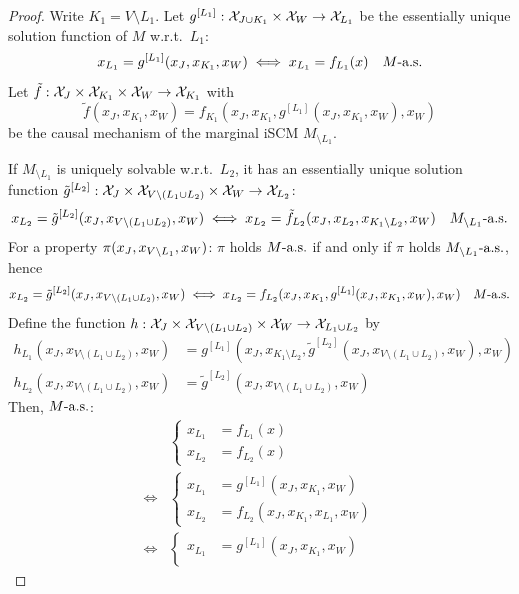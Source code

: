 \begin{proof}
  Write $K_1 = V \setminus L_1$.
  Let $g^{[L_1]} : \mathcal{X}_{J\cup K_1} \times \mathcal{X}_{W} \to \mathcal{X}_{L_1}$ be the essentially unique solution function of $M$ w.r.t.\ $L_1$:
  $$x_{L_1} = g^{[L_1]}(x_J,x_{K_1},x_W) \iff x_{L_1} = f_{L_1}(x) \quad M\text{-a.s.}$$
  Let $\tilde{f} : \mathcal{X}_J \times \mathcal{X}_{K_1} \times \mathcal{X}_{W} \to \mathcal{X}_{K_1}$ with
  $$\tilde{f}(x_J,x_{K_1},x_W) = f_{K_1}(x_J,x_{K_1},g^{[L_1]}(x_J,x_{K_1},x_W),x_W)$$
  be the causal mechanism of the marginal iSCM $M_{\setminus L_1}$.

  If $M_{\setminus L_1}$ is uniquely solvable w.r.t.\ $L_2$, it has an essentially unique solution function
  $\tilde{g}^{[L_2]} : \mathcal{X}_{J} \times \mathcal{X}_{V\setminus (L_1\cup L_2)} \times \mathcal{X}_{W} \to \mathcal{X}_{L_2}$:
  $$x_{L_2} = \tilde{g}^{[L_2]}(x_J,x_{V\setminus(L_1\cup L_2)},x_W) \iff x_{L_2} = \tilde{f}_{L_2}(x_J,x_{L_2},x_{K_1\setminus L_2},x_W) \quad M_{\setminus L_1}\text{-a.s.}$$
  For a property $\pi(x_J,x_{V\setminus L_1},x_W)$: $\pi$ holds $M\text{-a.s.}$ if and only if $\pi$ holds $M_{\setminus L_1}\text{-a.s.}$, hence
  $$x_{L_2} = \tilde{g}^{[L_2]}(x_J,x_{V\setminus(L_1\cup L_2)},x_W) \iff x_{L_2} = f_{L_2}(x_J,x_{K_1},g^{[L_1]}(x_J,x_{K_1},x_W),x_W) \quad M\text{-a.s.}$$
  Define the function $h : \mathcal{X}_{J} \times \mathcal{X}_{V\setminus(L_1\cup L_2)} \times \mathcal{X}_{W} \to \mathcal{X}_{L_1 \cup L_2}$ by
  \begin{align*}
    h_{L_1}(x_J,x_{V\setminus(L_1\cup L_2)},x_W) &= g^{[L_1]}(x_J,x_{K_1\setminus L_2},\tilde{g}^{[L_2]}(x_J,x_{V\setminus(L_1 \cup L_2)},x_W),x_W) \\
    h_{L_2}(x_J,x_{V\setminus(L_1\cup L_2)},x_W) &= \tilde{g}^{[L_2]}(x_J,x_{V\setminus(L_1 \cup L_2)},x_W)
  \end{align*}
  Then, $M\text{-a.s.}$:
  \begin{equation*}\begin{split}
    & \begin{cases}
      x_{L_1} &= f_{L_1}(x) \\
      x_{L_2} &= f_{L_2}(x) 
    \end{cases} \\
    \iff &
    \begin{cases}
      x_{L_1} &= g^{[L_1]}(x_J,x_{K_1},x_W) \\
      x_{L_2} &= f_{L_2}(x_J,x_{K_1},x_{L_1},x_W) 
    \end{cases} \\
    \iff &
    \begin{cases}
      x_{L_1} &= g^{[L_1]}(x_J,x_{K_1},x_W) \\

\end{cases}
\end{split}
\end{equation*}
\end{proof}
